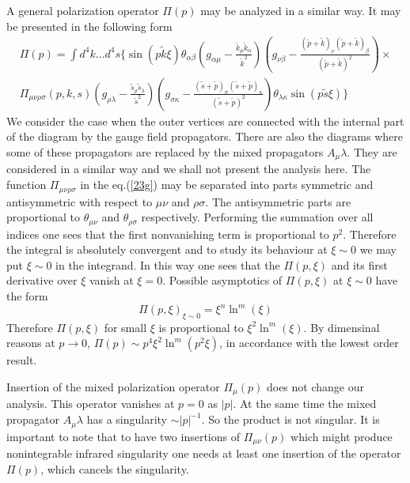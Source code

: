 \documentclass[a4paper,12pt]{article}
\begin{document}
A general polarization operator $\Pi(p)$ may be analyzed in a similar way.
It may be presented in the following form
\begin{eqnarray}
\Pi(p)= \int d^4k \ldots d^4s \{\sin(p \tilde{k} \xi) \theta_{\alpha 
 \beta}(g_{\alpha \mu}- \frac{\tilde{k}_{\mu} 
\tilde{k}_{\alpha}}{\tilde{k}^2})(g_{\nu \beta}- \frac{(\tilde{p}+ 
\tilde{k})_{\nu}(\tilde{p}+ \tilde{k})_{\beta}}{(\tilde{p}+ \tilde{k})^2}) 
\times\nonumber\\
\Pi_{\mu \nu \rho \sigma}(p,k,s)(g_{\rho \lambda}- 
 \frac{\tilde{s}_{\rho} \tilde{s}_{\lambda}}{\tilde{s}^2})(g_{\sigma 
 \kappa}- \frac{(\tilde{s}+ \tilde{p})_{\sigma}(\tilde{s}+ 
\tilde{p})_{\kappa}}{(\tilde{s}+ \tilde{p})^2}) \theta_{\lambda \kappa} 
\sin(p \tilde{s} \xi) \} \label{23g} \end{eqnarray} We consider the case 
when the outer vertices are connected with the internal part of the 
 diagram by the gauge field propagators.  There are also the diagrams 
 where some of these propagators are replaced by the mixed propagators 
 $A_{\mu} \lambda$. They are considered in a similar way and we shall not 
 present the analysis here. The function $\Pi_{\mu \nu \rho \sigma}$ in 
 the eq.(\ref{23g}) may be separated into parts symmetric and 
 antisymmetric with respect to $\mu \nu$ and $\rho \sigma$. The 
 antisymmetric parts are proportional to $\theta_{\mu \nu}$ and 
 $\theta_{\rho \sigma}$ respectively. 
 Performing the summation over all indices one sees that the first 
 nonvanishing term is proportional to $p^2$. 
 Therefore the integral is absolutely convergent and to study its 
behaviour at $\xi \sim 0$ we may put $\xi \sim 0$ in the integrand.
In this way one sees that the $\Pi(p, \xi)$ and its first derivative over 
$\xi$ vanish at $\xi=0$. Possible asymptotics of $\Pi(p, \xi)$ at $\xi 
\sim 0$ have the form 
\begin{equation} 
\Pi(p, \xi)_{\xi \sim 0}=\xi^n \ln^m(\xi)
\label{23i}
\end{equation}
 Therefore $\Pi(p, \xi)$ for small $\xi$ is proportional to $\xi^2 
\ln^m(\xi)$.  By dimensinal reasons at $p \rightarrow 0$, $\Pi(p) \sim p^4 
\xi^2 \ln^m(p^2 \xi)$, in accordance with the lowest order result.
 
 Insertion of the mixed polarization operator $\Pi_{\mu}(p)$ does not 
 change our analysis. This operator vanishes at $p=0$ as $|p|$. At the 
 same time the mixed propagator $A_{\mu} \lambda$ has a singularity $\sim 
 |p|^{-1}$. So the product is not singular. It is important to note that 
 to have two insertions of $\Pi_{\mu \nu}(p)$ which might produce 
 nonintegrable infrared singularity one needs at least one insertion of 
 the operator $\Pi(p)$, which cancels the singularity.
\end{document}
